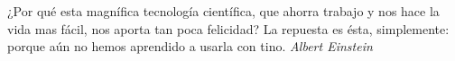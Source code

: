 %
\chapter*{}
\begin{flushright}

\begin{minipage}{13cm}
\begin{flushright}


¿Por qué esta magnífica tecnología científica, que ahorra trabajo y nos hace la vida mas fácil, nos aporta tan poca felicidad? 
La repuesta es ésta, simplemente: porque aún no hemos aprendido a usarla con tino.
\textit{Albert Einstein}


\end{flushright}
\end{minipage}

\end{flushright}
